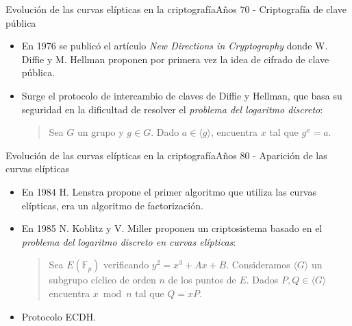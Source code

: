 \documentclass[spanish]{beamer}
\begin{document}
\begin{frame}[fragile]{Evolución de las curvas elípticas en la criptografía}{Años 70 - Criptografía de clave pública}
  \begin{itemize}
  \item En 1976 se publicó el artículo \textit{New Directions in Cryptography} donde W. Diffie y M. Hellman proponen por primera vez la idea de cifrado de clave pública. %
  \item Surge el protocolo de intercambio de claves de Diffie y Hellman, que basa su seguridad en la dificultad de resolver el \textit{problema del logaritmo discreto}:
  
  \begin{quote}
    \vspace{1em} 
    Sea \(G\) un grupo y $g \in G$. Dado \(a \in \langle g \rangle\), encuentra \(x\) tal que \(g^x = a\). %
\end{quote}
  \end{itemize}
\end{frame}

\begin{frame}[fragile]{Evolución de las curvas elípticas en la criptografía}{Años 80 - Aparición de las curvas elípticas}
  \begin{itemize}
    \item En 1984 H. Lenstra propone el primer algoritmo que utiliza las curvas elípticas, era un algoritmo de factorización.
    \item En 1985 N. Koblitz y V. Miller proponen un criptosistema basado en el \textit{problema del logaritmo discreto en curvas elípticas}:
    
    \begin{quote}
      \vspace{.5em} 
      Sea $E(\mathbb{F}_p)$ verificando $y^2 =x^3 + Ax + B$. Consideramos $\langle G \rangle$ un subgrupo cíclico de orden $n$ de los puntos de $E$. Dados $P,Q \in \langle G \rangle$ encuentra $x \bmod{n}$ tal que $Q=xP$.
      \vspace{.5em}
      \end{quote}
    \item Protocolo ECDH. 
  \end{itemize}
\end{frame}
\end{document}
